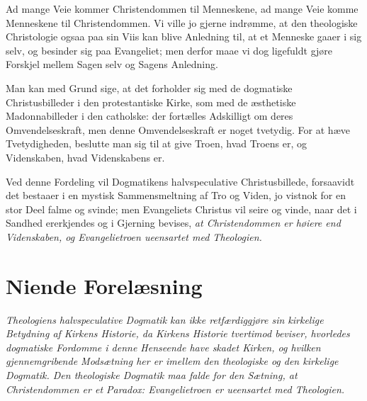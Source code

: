 \documentclass[12pt,a4paper]{book}
\newcommand{\opage}[1]{\marginnote{\footnotesize\textit{[#1]}}}
\begin{document}
Ad mange Veie kommer Christendommen til Menneskene, ad mange Veie komme
Menneskene til Christendommen. Vi ville jo gjerne indrømme, at den
theologiske Christologie ogsaa paa sin Viis kan blive Anledning til, at et
Menneske gaaer i sig selv, og besinder sig paa Evangeliet; men derfor maae
vi dog ligefuldt gjøre Forskjel mellem Sagen selv og Sagens Anledning.

Man kan med Grund sige, at det forholder sig med de dogmatiske
Christusbilleder i den protestantiske Kirke, som med de æsthetiske
Madonnabilleder i den catholske: der fortælles Adskilligt om deres
Omvendelseskraft, men denne Omvendelseskraft er noget tvetydig. For at hæve
Tvetydigheden, beslutte man sig til
\opage{111} at give Troen, hvad Troens er, og Videnskaben, hvad Videnskabens er.

Ved denne Fordeling vil Dogmatikens halvspeculative Christusbillede,
forsaavidt det bestaaer i en mystisk Sammensmeltning af Tro og Viden, jo
vistnok for en stor Deel falme og svinde; men Evangeliets Christus vil
seire og vinde, naar det i Sandhed ererkjendes og i Gjerning bevises,
\emph{at Christendommen er høiere end Videnskaben, og Evangelietroen
ueensartet med Theologien.}

\chapter*{Niende Forelæsning}
\label{ch:forel9}

\begin{center}\itshape
Theologiens halvspeculative Dogmatik kan ikke retfærdiggjøre sin kirkelige
Betydning af Kirkens Historie, da Kirkens Historie tvertimod beviser,
hvorledes dogmatiske Fordomme i denne Henseende have skadet Kirken, og
hvilken gjennemgribende Modsætning her er imellem den theologiske og den
kirkelige Dogmatik. Den theologiske Dogmatik maa falde for den Sætning,
at Christendommen er et Paradox: Evangelietroen er ueensartet med
Theologien.
\end{center}
\end{document}
